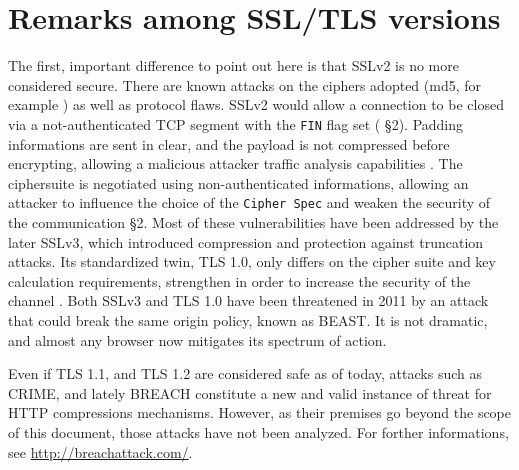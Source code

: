 \section{Remarks among SSL/TLS versions}

The first, important difference to point out here is that SSLv2 is no more
considered secure. There are known attacks on the ciphers adopted (md5, for
example \cite{rfc6176}) as well as protocol flaws.
SSLv2 would allow a connection to be closed via a not-authenticated TCP segment
with the \texttt{FIN} flag set (\cite{rfc6176} \S 2). Padding informations are sent in
clear, and the payload is not compressed before encrypting, allowing a malicious
attacker traffic analysis capabilities \cite{sslpadding}. The ciphersuite is negotiated using
non-authenticated informations, allowing an attacker to influence the choice of
the \texttt{Cipher Spec} and weaken the security of the communication
\cite{rfc6176} \S 2.
Most of these vulnerabilities have been addressed by the later SSLv3, which
introduced compression and protection against truncation attacks.
Its standardized twin, TLS 1.0, only differs on the cipher suite and key
calculation requirements, strengthen in order to increase the security of the
channel \cite{rfc2246}.
Both SSLv3 and TLS 1.0 have been threatened in 2011 by an attack that could break
the same origin policy, known as BEAST. It is not dramatic, and almost any
browser now mitigates its spectrum of action.

Even if TLS 1.1, and TLS 1.2 are considered safe as of today, attacks such as
CRIME, and lately BREACH constitute a new and valid instance of threat for HTTP
compressions mechanisms. However, as their premises go beyond the scope of this
document, those attacks have not been analyzed. For forther informations, see
\url{http://breachattack.com/}.

